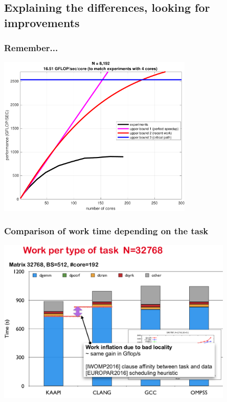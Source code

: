 \documentclass[xcolor={usenames,dvipsnames,svgnames,table}, aspectratio=43]{beamer}
\begin{document}
\subsection{Explaining the differences, looking for improvements}

\begin{frame}
  \frametitle{Remember...}
  \begin{center}
    \includegraphics[width=0.7\textwidth]{graph/kaapi_upperbound-crop.pdf}
  \end{center}
\end{frame}

\begin{frame}
  \frametitle{Comparison of work time depending on the task}
  \begin{center}
    \includegraphics[width=0.85\textwidth]{graph/work_per_task.pdf}
  \end{center}
\end{frame}
\end{document}
